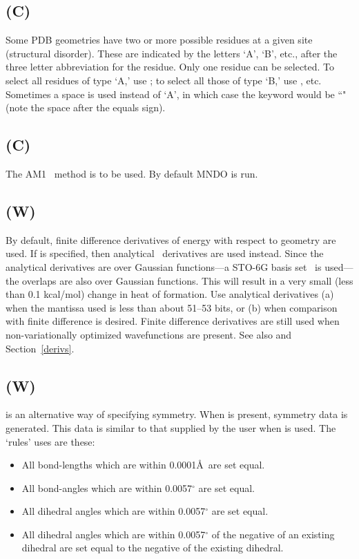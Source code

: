 \subsection*{ (C)}
Some PDB geometries have two or more possible residues at a given site
(structural disorder).  These are indicated by the letters `A', `B', etc.,
after  the three letter abbreviation for the residue.  Only one residue can be
selected.  To select all residues of type `A,' use ; to select
all those of type `B,' use , etc. Sometimes a space is used
instead of `A', in which case the keyword would be ``" (note the
space after the equals sign).

\subsection*{ (C)}
The AM1~\cite{am1} method is to be used.  By default MNDO is run.

\subsection*{ (W)}
By default, finite difference derivatives of energy with respect  to geometry
are  used.  If  is specified, then analytical~\cite{analyt}
derivatives are used instead.  Since the analytical  derivatives  are  over
Gaussian functions---a  STO-6G  basis set~\cite{sto-6g} is used---the overlaps
are also over Gaussian functions.  This will result in a  very  small  (less
than  0.1 kcal/mol)  change  in heat of formation.  Use analytical derivatives
(a) when the mantissa used is  less  than  about 51--53  bits,  or  (b)  when
comparison   with   finite  difference  is  desired.   Finite  difference
derivatives are still used when non-variationally optimized wavefunctions are
present. See also  and Section~\ref{derivs}.

\subsection*{ (W)}
 is an alternative way of specifying symmetry.  When
 is present, symmetry data is generated.  This data is similar to
that supplied by the user when  is used.  The `rules'
 uses are these:

\begin{itemize}
\item All bond-lengths which are within 0.0001\AA\ are set equal.
\item All bond-angles which are within 0.0057$^{\circ}$ are set equal.
\item All dihedral angles which are within 0.0057$^{\circ}$ are set equal.
\item All dihedral angles which are within 0.0057$^{\circ}$ of the negative
of an existing dihedral are set equal to the negative of the existing
dihedral.
\end{itemize}

